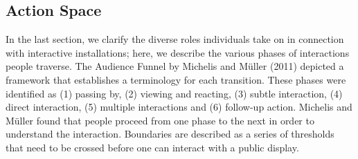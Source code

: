 \subsection* {Action Space}
In the last section, we clarify the diverse roles individuals take on in connection with interactive installations; here, we describe the various phases of interactions people traverse. 
The Audience Funnel by Michelis and Müller (2011) depicted a framework that establishes a terminology for each transition. 
These phases were identified as (1) passing by, (2) viewing and reacting, (3) subtle interaction, (4) direct interaction, (5) multiple interactions and (6) follow-up action. 
Michelis and Müller found that people proceed from one phase to the next in order to understand the interaction. 
Boundaries are described as a series of thresholds that need to be crossed before one can interact with a public display.


